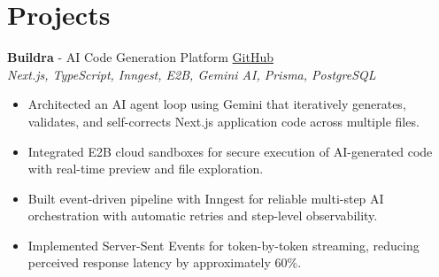 \documentclass[11pt,letterpaper]{article}
\newcommand{\resumeItem}[1]{\item #1}
\newcommand{\projectHeader}[4]{
  \textbf{#1} - #2 \hfill #3\\
  \textit{#4}
}
\begin{document}

\section{Projects}

\projectHeader
  {Buildra}
  {AI Code Generation Platform}
  {\href{https://github.com/vbhvx/Buildra}{GitHub}}
  {Next.js, TypeScript, Inngest, E2B, Gemini AI, Prisma, PostgreSQL}
\begin{itemize}
  \resumeItem{Architected an AI agent loop using Gemini that iteratively generates, validates, and self-corrects Next.js application code across multiple files.}
  \resumeItem{Integrated E2B cloud sandboxes for secure execution of AI-generated code with real-time preview and file exploration.}
  \resumeItem{Built event-driven pipeline with Inngest for reliable multi-step AI orchestration with automatic retries and step-level observability.}
  \resumeItem{Implemented Server-Sent Events for token-by-token streaming, reducing perceived response latency by approximately 60\%.}
\end{itemize}
\end{document}
